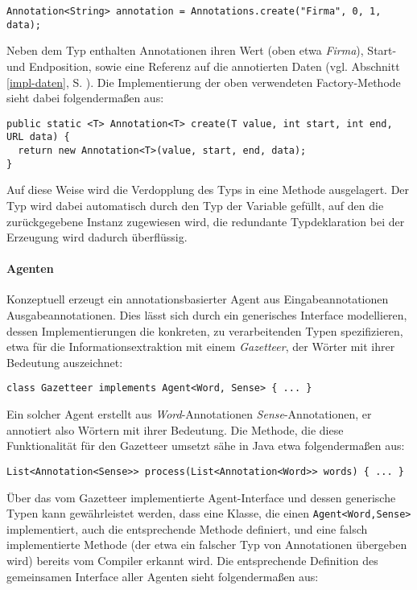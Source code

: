 \documentclass[abstracton, 12pt]{scrartcl}
\begin{document}
\begin{lstlisting}
Annotation<String> annotation = Annotations.create("Firma", 0, 1, data);
\end{lstlisting}

Neben dem Typ enthalten Annotationen ihren Wert (oben etwa \emph{Firma}), Start- und Endposition, sowie eine Referenz auf die annotierten Daten (vgl. Abschnitt \ref{impl-daten}, S. \pageref{impl-daten}). Die Implementierung der oben verwendeten Factory-Methode sieht dabei folgendermaßen aus:

\begin{lstlisting}
public static <T> Annotation<T> create(T value, int start, int end, URL data) {
  return new Annotation<T>(value, start, end, data);
}
\end{lstlisting}

Auf diese Weise wird die Verdopplung des Typs in eine Methode ausgelagert. Der Typ wird dabei automatisch durch den Typ der Variable gefüllt, auf den die zurückgegebene Instanz zugewiesen wird, die redundante Typdeklaration bei der Erzeugung wird dadurch überflüssig. 

\paragraph{Agenten}

Konzeptuell erzeugt ein annotationsbasierter Agent aus Eingabeannotationen Ausgabeannotationen. Dies lässt sich durch ein generisches Interface modellieren, dessen Implementierungen die konkreten, zu verarbeitenden Typen spezifizieren, etwa für die Informationsextraktion mit einem \emph{Gazetteer}, der Wörter mit ihrer Bedeutung auszeichnet:

\begin{lstlisting}
class Gazetteer implements Agent<Word, Sense> { ... }
\end{lstlisting}

Ein solcher Agent erstellt aus \emph{Word}-Annotationen \emph{Sense}-Annotationen, er annotiert also Wörtern mit ihrer Bedeutung. Die Methode, die diese Funktionalität für den Gazetteer umsetzt sähe in Java etwa folgendermaßen aus:

\begin{lstlisting}
List<Annotation<Sense>> process(List<Annotation<Word>> words) { ... }
\end{lstlisting}

Über das vom Gazetteer implementierte Agent-Interface und dessen generische Typen kann ge\-währ\-leist\-et werden, dass eine Klasse, die einen \lstinline!Agent<Word,Sense>! implementiert, auch die entsprechende Methode definiert, und eine falsch implementierte Methode (der etwa ein falscher Typ von Annotationen übergeben wird) bereits vom Compiler erkannt wird. Die entsprechende Definition des gemeinsamen Interface aller Agenten sieht folgendermaßen aus:
\end{document}

